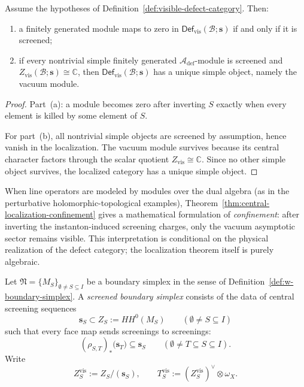 \begin{theorem}
\label{thm:central-localization-confinement}
Assume the hypotheses of Definition~\ref{def:visible-defect-category}.
Then:
\begin{enumerate}[label=(\alph*)]
\item a finitely generated module maps to zero in $\mathsf{Def}_{\mathrm{vis}}(\mathcal B;\mathbf s)$ if and only if it is screened;
\item if every nontrivial simple finitely generated $\mathcal A_{\mathrm{def}}$-module is screened and
$Z_{\mathrm{vis}}(\mathcal B;\mathbf s)\cong \mathbb C$, then $\mathsf{Def}_{\mathrm{vis}}(\mathcal B;\mathbf s)$ has a unique simple object,
namely the vacuum module.
\end{enumerate}
\end{theorem}

\begin{proof}
Part~(a): a module becomes zero after inverting $S$ exactly when every element is killed by some element of $S$.

For part~(b), all nontrivial simple objects are screened by assumption, hence vanish in the localization.
The vacuum module survives because its central character factors through the scalar quotient
$Z_{\mathrm{vis}}\cong \mathbb C$. Since no other simple object survives, the localized category has a unique
simple object.
\end{proof}

\begin{remark}
\label{rem:physical-interpretation-confinement}
When line operators are modeled by modules over the dual algebra (as in the perturbative holomorphic-topological
examples), Theorem~\ref{thm:central-localization-confinement}
gives a mathematical formulation of \emph{confinement}: after inverting the instanton-induced screening
charges, only the vacuum asymptotic sector remains visible.
This interpretation is conditional on the physical realization of the defect category; the localization theorem itself is purely algebraic.
\end{remark}

\begin{definition}
\label{def:screened-boundary-simplex}
Let $\mathfrak N=\{M_S\}_{\emptyset\neq S\subseteq I}$ be a boundary simplex in the sense of
Definition~\ref{def:w-boundary-simplex}.
A \emph{screened boundary simplex} consists of the data of central screening sequences
\[
\mathbf s_S\subset Z_S:=HH^0(M_S)
\qquad (\emptyset\neq S\subseteq I)
\]
such that every face map sends screenings to screenings:
\[
(\rho_{S,T})_*\bigl(\mathbf s_T\bigr)\subseteq \mathbf s_S
\qquad (\emptyset\neq T\subseteq S\subseteq I).
\]
Write
\[
Z_S^{\mathrm{vis}}:=Z_S/(\mathbf s_S),
\qquad
T_S^{\mathrm{vis}}:=(Z_S^{\mathrm{vis}})^{\vee}\otimes \omega_X.
\]
\end{definition}

